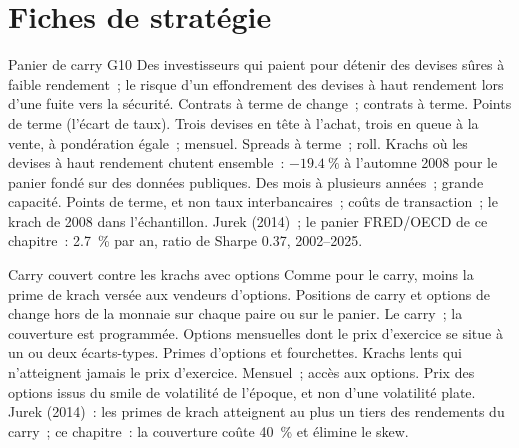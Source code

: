 \section{Fiches de stratégie}

\begin{strategyfile}{Panier de carry G10}\label{strat:s2:cross-currency-basis-and-fx-carry:basket}
 Des investisseurs qui paient pour détenir des devises sûres à faible rendement~; le risque d'un effondrement des devises à haut rendement lors d'une fuite vers la sécurité.
 Contrats à terme de change~; contrats à terme.
 Points de terme (l'écart de taux).
 Trois devises en tête à l'achat, trois en queue à la vente, à pondération égale~; mensuel.
 Spreads à terme~; roll.
 Krachs où les devises à haut rendement chutent ensemble~: $-19.4~\%$ à l'automne 2008 pour le panier fondé sur des données publiques.
 Des mois à plusieurs années~; grande capacité.
 Points de terme, et non taux interbancaires~; coûts de transaction~; le krach de 2008 dans l'échantillon.
 Jurek (2014)~; le panier FRED/OECD de ce chapitre~: 2.7~\% par an, ratio de Sharpe 0.37, 2002--2025.
\end{strategyfile}

\begin{strategyfile}{Carry couvert contre les krachs avec options}\label{strat:s2:cross-currency-basis-and-fx-carry:hedged}
 Comme pour le carry, moins la prime de krach versée aux vendeurs d'options.
 Positions de carry et options de change hors de la monnaie sur chaque paire ou sur le panier.
 Le carry~; la couverture est programmée.
 Options mensuelles dont le prix d'exercice se situe à un ou deux écarts-types.
 Primes d'options et fourchettes.
 Krachs lents qui n'atteignent jamais le prix d'exercice.
 Mensuel~; accès aux options.
 Prix des options issus du smile de volatilité de l'époque, et non d'une volatilité plate.
 Jurek (2014)~: les primes de krach atteignent au plus un tiers des rendements du carry~; ce chapitre~: la couverture coûte 40~\% et élimine le skew.
\end{strategyfile}

